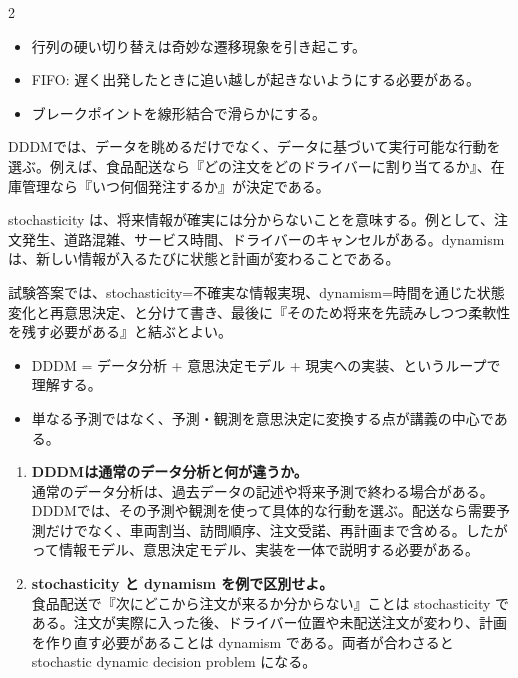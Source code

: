\clearpage
{}
\begin{multicols}{2}\footnotesize\raggedcolumns
{}
\begin{itemize}
\item 行列の硬い切り替えは奇妙な遷移現象を引き起こす。
\item FIFO: 遅く出発したときに追い越しが起きないようにする必要がある。
\item ブレークポイントを線形結合で滑らかにする。
\end{itemize}
DDDMでは、データを眺めるだけでなく、データに基づいて実行可能な行動を選ぶ。例えば、食品配送なら『どの注文をどのドライバーに割り当てるか』、在庫管理なら『いつ何個発注するか』が決定である。\par

stochasticity は、将来情報が確実には分からないことを意味する。例として、注文発生、道路混雑、サービス時間、ドライバーのキャンセルがある。dynamism は、新しい情報が入るたびに状態と計画が変わることである。\par

試験答案では、stochasticity=不確実な情報実現、dynamism=時間を通じた状態変化と再意思決定、と分けて書き、最後に『そのため将来を先読みしつつ柔軟性を残す必要がある』と結ぶとよい。\par
{}
\begin{itemize}
\item DDDM = データ分析 + 意思決定モデル + 現実への実装、というループで理解する。
\item 単なる予測ではなく、予測・観測を意思決定に変換する点が講義の中心である。
\end{itemize}
\begin{enumerate}
\item \textbf{DDDMは通常のデータ分析と何が違うか。}\\通常のデータ分析は、過去データの記述や将来予測で終わる場合がある。DDDMでは、その予測や観測を使って具体的な行動を選ぶ。配送なら需要予測だけでなく、車両割当、訪問順序、注文受諾、再計画まで含める。したがって情報モデル、意思決定モデル、実装を一体で説明する必要がある。
\item \textbf{stochasticity と dynamism を例で区別せよ。}\\食品配送で『次にどこから注文が来るか分からない』ことは stochasticity である。注文が実際に入った後、ドライバー位置や未配送注文が変わり、計画を作り直す必要があることは dynamism である。両者が合わさると stochastic dynamic decision problem になる。
\end{enumerate}
\end{multicols}

